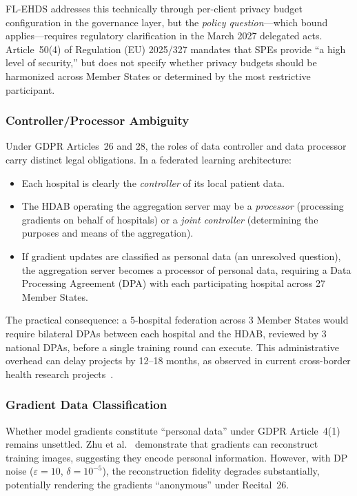 \documentclass[conference]{IEEEtran}
\begin{document}
FL-EHDS addresses this technically through per-client privacy budget configuration in the governance layer, but the \textit{policy question}---which bound applies---requires regulatory clarification in the March 2027 delegated acts. Article~50(4) of Regulation (EU) 2025/327 mandates that SPEs provide ``a high level of security,'' but does not specify whether privacy budgets should be harmonized across Member States or determined by the most restrictive participant.

\subsubsection{Controller/Processor Ambiguity}

Under GDPR Articles~26 and 28, the roles of data controller and data processor carry distinct legal obligations. In a federated learning architecture:
\begin{itemize}
    \item Each hospital is clearly the \textit{controller} of its local patient data.
    \item The HDAB operating the aggregation server may be a \textit{processor} (processing gradients on behalf of hospitals) or a \textit{joint controller} (determining the purposes and means of the aggregation).
    \item If gradient updates are classified as personal data (an unresolved question), the aggregation server becomes a processor of personal data, requiring a Data Processing Agreement (DPA) with each participating hospital across 27 Member States.
\end{itemize}

The practical consequence: a 5-hospital federation across 3 Member States would require bilateral DPAs between each hospital and the HDAB, reviewed by 3 national DPAs, before a single training round can execute. This administrative overhead can delay projects by 12--18 months, as observed in current cross-border health research projects~\cite{frohlich2025reality}.

\subsubsection{Gradient Data Classification}

Whether model gradients constitute ``personal data'' under GDPR Article~4(1) remains unsettled. Zhu et al.~\cite{zhu2019deep} demonstrate that gradients can reconstruct training images, suggesting they encode personal information. However, with DP noise ($\varepsilon = 10$, $\delta = 10^{-5}$), the reconstruction fidelity degrades substantially, potentially rendering the gradients ``anonymous'' under Recital~26.
\end{document}
